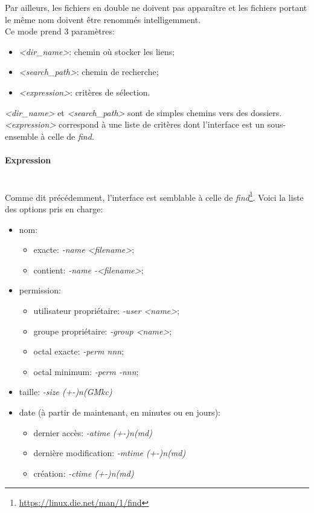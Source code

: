 \documentclass[11pt, a4paper]{article}
\newcommand{\paragraphnl}[1]{\paragraph{#1}\mbox{}\\}
\begin{document}
Par ailleurs, les fichiers en double ne doivent pas apparaître et les fichiers portant le même nom doivent être renommés intelligemment. \\

Ce mode prend 3 paramètres:
\begin{itemize}
    \item \textit{<dir\_name>}: chemin où stocker les liens;
    \item \textit{<search\_path>}: chemin de recherche;
    \item \textit{<expression>}: critères de sélection. \\
\end{itemize}

\textit{<dir\_name>} et \textit{<search\_path>} sont de simples chemins vers des dossiers.\\
\textit{<expression>} correspond à une liste de critères dont l'interface est un sous-ensemble à celle de \textit{find}.

\newpage

\paragraphnl{Expression}
Comme dit précédemment, l'interface est semblable à celle de \textit{find}\footnote{\url{https://linux.die.net/man/1/find}}.
Voici la liste des options pris en charge:

\begin{itemize}
    \item nom:
    \begin{itemize}
        \item exacte: \textit{-name <filename>};
        \item contient: \textit{-name -<filename>};
    \end{itemize}
    \item permission:
    \begin{itemize}
        \item utilisateur propriétaire: \textit{-user <name>};
        \item groupe propriétaire: \textit{-group <name>};
        \item octal exacte: \textit{-perm nnn};
        \item octal minimum: \textit{-perm -nnn};
    \end{itemize}
    \item taille: \textit{-size (+-)n(GMkc)}
    \item date (à partir de maintenant, en minutes ou en jours):
    \begin{itemize}
        \item dernier accès: \textit{-atime (+-)n(md)}
        \item dernière modification: \textit{-mtime (+-)n(md)}
        \item création: \textit{-ctime (+-)n(md)} \\
    \end{itemize}
\end{itemize}
\end{document}
